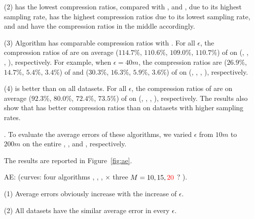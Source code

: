 \ni (2) \pricar has the lowest compression ratios, compared with \truck, \sercar and \geolife, due to its highest sampling rate,
\truck has the highest compression ratios due to its lowest sampling rate, and \sercar and \geolife have the compression ratios in the middle accordingly.

\ni (3) Algorithm \cist has \textcolor[rgb]{1.00,0.00,0.00}{comparable} compression ratios with \dpa.
For all $\epsilon$, the compression ratios of \cist are on average ($114.7\%$, $110.6\%$, $109.0\%$, $110.7\%$) of \dpa on (\truck, \sercar, \geolife, \pricar), respectively.
For example, when $\epsilon = 40m$, the compression ratios are ($26.9\%$, $14.7\%$, $5.4\%$, $3.4\%$) of \dpa and ($30.3\%$, $16.3\%$, $5.9\%$, $3.6\%$) of \cist on (\truck, \sercar, \geolife, \pricar), respectively.

\ni (4) \cist is better than  \squishe on all datasets.
For all $\epsilon$, the compression ratios of \cist are on average ($92.3\%$, $80.0\%$, $72.4\%$, {$73.5\%$}) of \squishe on (\truck, \sercar, \geolife, \pricar), respectively.
The results also show that \cist has better compression ratios than \squishe on datasets with higher sampling rates.




.
To evaluate the average errors of these algorithms, we varied $\epsilon$ from $10m$ to $200m$ on the entire \truck, \sercar, \geolife and \pricar, respectively.

The results are reported in Figure~\ref{fig:ae}.

AE: (\textcolor[rgb]{0.00,0.07,1.00}{curves: four algorithms \cist, \cista, \dpa, \squishe  $\times$  three $M = 10, 15, \textcolor[rgb]{1.00,0.00,0.00}{20}$ ? }).

\ni(1) Average errors obviously increase with the increase of $\epsilon$.

\ni(2) All datasets have the similar average \sed error in every $\epsilon$.


